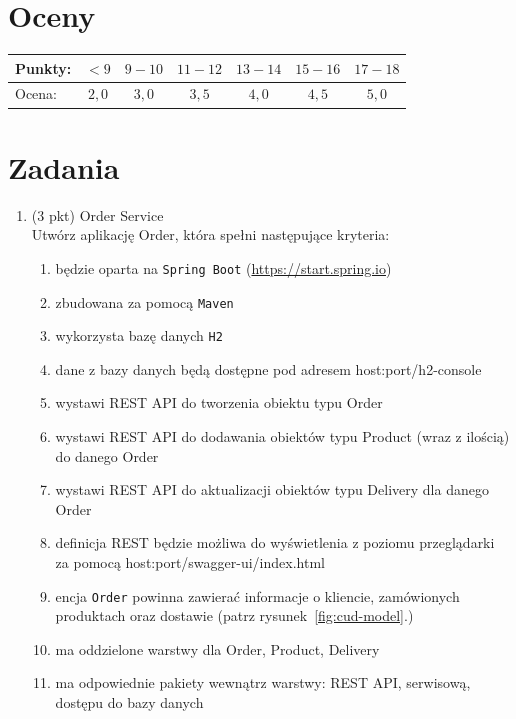 \documentclass[12pt]{article}
\begin{document}
    \section*{Oceny}
    \begin{tabular}{|l|c|c|c|c|c|c|}
        \hline
        Punkty: & $<9$ & $9-10$ & $11-12$ & $13-14$ & $15-16$ & $17-18$\\
        \hline
        Ocena: & $2,0$ & $3,0$ & $3,5$ & $4,0$ & $4,5$ & $5,0$\\
        \hline
    \end{tabular}

    \section*{Zadania}
    \begin{enumerate}
        \item\label{exc:order_service}
            (3 pkt) Order Service\\
            Utwórz aplikację Order, która spełni następujące kryteria:
            \begin{enumerate}
                \item będzie oparta na \texttt{Spring Boot} (\url{https://start.spring.io})
                \item zbudowana za pomocą \texttt{Maven}
                \item wykorzysta bazę danych \texttt{H2} 
                \item dane z bazy danych będą dostępne pod adresem host:port/h2-console
                \item wystawi REST API do tworzenia obiektu typu Order
                \item wystawi REST API do dodawania obiektów typu Product (wraz z ilością) do danego Order
                \item wystawi REST API do aktualizacji obiektów typu Delivery dla danego Order
                \item definicja REST będzie możliwa do wyświetlenia z poziomu przeglądarki za pomocą host:port/swagger-ui/index.html
                \item encja \texttt{Order} powinna zawierać informacje o kliencie, zamówionych produktach oraz dostawie (patrz rysunek~\ref{fig:cud-model}.)
                \item ma oddzielone warstwy dla Order, Product, Delivery
                \item ma odpowiednie pakiety wewnątrz warstwy: REST API, serwisową, dostępu do bazy danych
            \end{enumerate}


\end{enumerate}
\end{document}
